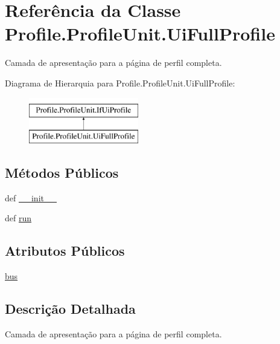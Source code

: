 \hypertarget{classProfile_1_1ProfileUnit_1_1UiFullProfile}{\section{Referência da Classe Profile.\-Profile\-Unit.\-Ui\-Full\-Profile}
\label{classProfile_1_1ProfileUnit_1_1UiFullProfile}
}


Camada de apresentação para a página de perfil completa.  


Diagrama de Hierarquia para Profile.\-Profile\-Unit.\-Ui\-Full\-Profile\-:\begin{figure}[H]
\begin{center}
\leavevmode
\includegraphics[height=2.000000cm]{db/d57/classProfile_1_1ProfileUnit_1_1UiFullProfile}
\end{center}
\end{figure}
\subsection*{Métodos Públicos}
\begin{DoxyCompactItemize}
\item 
def \hyperlink{classProfile_1_1ProfileUnit_1_1UiFullProfile_ae9ec0c6554ceb52fd45d48dda2ea4218}{\-\_\-\-\_\-init\-\_\-\-\_\-}
\item 
def \hyperlink{classProfile_1_1ProfileUnit_1_1UiFullProfile_a7a7747246b627020a345f7a3eac27778}{run}
\end{DoxyCompactItemize}
\subsection*{Atributos Públicos}
\begin{DoxyCompactItemize}
\item 
\hyperlink{classProfile_1_1ProfileUnit_1_1UiFullProfile_a47049f3f61c7fada93dd84fccd19a2bd}{bus}
\end{DoxyCompactItemize}


\subsection{Descrição Detalhada}
Camada de apresentação para a página de perfil completa. 

